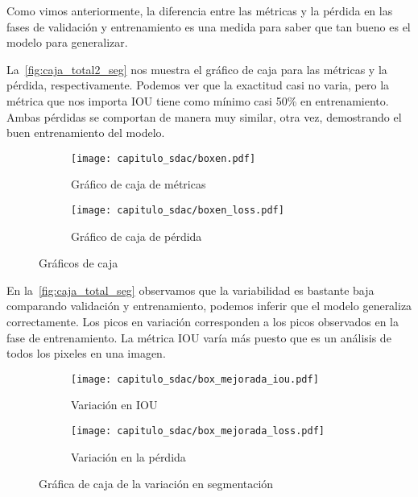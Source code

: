 Como vimos anteriormente, la diferencia entre las métricas y la pérdida en las fases de validación
y entrenamiento es una medida para saber que tan bueno es el modelo para generalizar. 

La~\autoref{fig:caja_total2_seg} nos muestra el gráfico de caja para las
métricas y la pérdida, respectivamente. Podemos ver que la exactitud casi no
varia, pero la métrica que nos importa IOU tiene como mínimo casi 50\% en
entrenamiento. Ambas pérdidas se comportan de manera muy similar, otra vez,
demostrando el buen entrenamiento del modelo.

\begin{figure}[H]
    \centering
    \begin{subfigure}[b]{0.8\textwidth}
        \centering
       \texttt{[image: capitulo\_sdac/boxen.pdf]}
       \caption{Gráfico de caja de métricas}\label{fig:caja_acc2_seg} 
    \end{subfigure}

    \begin{subfigure}[b]{0.8\textwidth}
        \centering
       \texttt{[image: capitulo\_sdac/boxen\_loss.pdf]}
       \caption{Gráfico de caja de pérdida}\label{fig:caja_loss2_seg}
    \end{subfigure}
    \caption{Gráficos de caja}\label{fig:caja_total2_seg}
\end{figure}

En la~\autoref{fig:caja_total_seg} observamos que la variabilidad es bastante
baja comparando validación y entrenamiento, podemos inferir que el modelo
generaliza correctamente. Los picos en variación corresponden a los picos
observados en la fase de entrenamiento. La métrica IOU varía más puesto que es
un análisis de todos los pixeles en una imagen.

\begin{figure}[H]
    \centering
    \begin{subfigure}[b]{0.6\textwidth}
        \centering
       \texttt{[image: capitulo\_sdac/box\_mejorada\_iou.pdf]}
       \caption{Variación en IOU}\label{fig:caja_acc_seg} 
    \end{subfigure}

    \begin{subfigure}[b]{0.6\textwidth}
        \centering
       \texttt{[image: capitulo\_sdac/box\_mejorada\_loss.pdf]}
       \caption{Variación en la pérdida}\label{fig:caja_loss_seg}
    \end{subfigure}
    \caption{Gráfica de caja de la variación en segmentación}\label{fig:caja_total_seg}
\end{figure}

